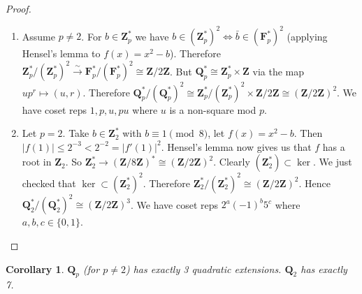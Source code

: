 \documentclass[10pt,]{book}
\newcommand{\lt}{<}
\theoremstyle{plain}
\newtheorem{corollary}[theorem]{Corollary}
\theoremstyle{definition}
\newcommand{\FF}{\mathbf{F}}
\newcommand{\QQ}{\mathbf{Q}}
\newcommand{\ZZ}{\mathbf{Z}}
\begin{document}
\begin{proof}
\begin{enumerate}
\item{}
                Assume \(p \ne 2\).
                For \(b \in \ZZ_p^*\) we have \(b \in (\ZZ_p^*)^2 \iff \bar b \in (\FF_p^*)^2\) (applying Hensel's lemma  to \(f(x) = x^2 -b\)).
                Therefore \(\ZZ_p^*/(\ZZ_p^*)^2 \xrightarrow{\sim} \FF_p^*/(\FF_p^*)^2 \cong \ZZ/2\ZZ\).
                But \(\QQ_p^* \cong \ZZ_p^* \times \ZZ\) via the map \(u p^r \mapsto (u,r)\).
                Therefore \(\QQ_p^*/(\QQ_p^*)^2\cong \ZZ_p^*/(\ZZ_p^*)^2 \times \ZZ/2\ZZ\cong (\ZZ/2\ZZ)^2\).
                We have coset reps \(1,p,u,pu\) where \(u\) is a non-square mod \(p\).
              \item{}
                Let \(p = 2\).
                Take \(b \in \ZZ_2^*\) with \(b \equiv 1 \pmod{8}\), let \(f(x) = x^2 -b\).
                Then \(|f(1) | \le 2^{-3}\lt 2^{-2} = |f'(1)|^2\).
                Hensel's lemma  now gives us that \(f\) has a root in \(\ZZ_2\).
                So \(\ZZ_2 ^* \to (\ZZ/8\ZZ)^* \cong (\ZZ/2\ZZ)^2\).
                Clearly \((\ZZ_2^*) \subset \ker\).
                We just checked that \(\ker \subset (\ZZ_2^*)^2\).
                Therefore \(\ZZ_2^*/(\ZZ_2^*)^2  \cong (\ZZ/2\ZZ)^2\).
                Hence \(\QQ_2^*/(\QQ_2^*)^2\cong (\ZZ/2\ZZ)^3\).
                We have coset reps \(2^a(-1)^b5^c\) where \(a,b,c\in\{0,1\}\).
              \end{enumerate}
\end{proof}
\begin{corollary}\label{corollary-3}
\(\QQ_p\) (for \(p \ne 2\)) has exactly 3 quadratic extensions.
            \(\QQ_2\) has exactly 7.
          \end{corollary}
\typeout{************************************************}
\typeout{************************************************}
\end{document}
